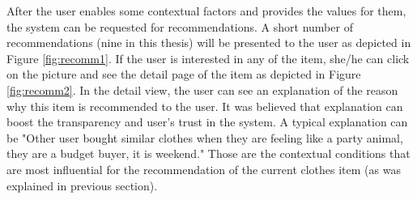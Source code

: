 After the user enables some contextual factors and provides the values for them, the system can be requested for recommendations. A short number of recommendations (nine in this thesis) will be presented to the user as depicted in Figure \ref{fig:recomm1}. If the user is interested in any of the item, she/he can click on the picture and see the detail page of the item as depicted in Figure \ref{fig:recomm2}. In the detail view, the user can see an explanation of the reason why this item is recommended to the user. It was believed that explanation can boost the transparency and user's trust in the system. A typical explanation can be "Other user bought similar clothes when they are feeling like a party animal, they are a budget buyer, it is weekend." Those are the contextual conditions that are most influential for the recommendation of the current clothes item (as was explained in previous section). 

